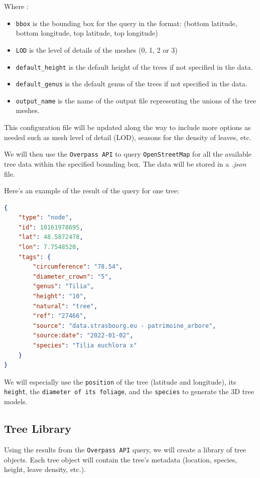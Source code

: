 \documentclass[12pt]{article}
\begin{document}
Where :
\begin{itemize}
    \item \texttt{bbox} is the bounding box for the query in the format:
    \subitem (bottom latitude, bottom longitude, top latitude, top longitude)

    \item \texttt{LOD} is the level of details of the meshes (0, 1, 2 or 3)
    \item \texttt{default\_height} is the default height of the trees if not specified in the data.
    \item \texttt{default\_genus} is the default genus of the trees if not specified in the data.
    \item \texttt{output\_name} is the name of the output file representing the unions of the tree meshes.
\end{itemize}

This configuration file will be updated along the way to include more options
as needed such as mesh level of detail (LOD), seasons for the density of leaves,
etc.

We will then use the \texttt{Overpass API} to query \texttt{OpenStreetMap}
for all the available tree data within the specified bounding box.
The data will be stored in a \textit{.json} file.

\newpage
Here's an example of the result of the query for one tree:

\begin{lstlisting}[language=json]
{
    "type": "node",
    "id": 10161978695,
    "lat": 48.5872478,
    "lon": 7.7548520,
    "tags": {
        "circumference": "78.54",
        "diameter_crown": "5",
        "genus": "Tilia",
        "height": "10",
        "natural": "tree",
        "ref": "27466",
        "source": "data.strasbourg.eu - patrimoine_arbore",
        "source:date": "2022-01-02",
        "species": "Tilia euchlora x"
    }
}
\end{lstlisting}

We will especially use the \texttt{position} of the tree (latitude and longitude),
its \texttt{height}, the \texttt{diameter of its foliage}, and the \texttt{species}
to generate the 3D tree models.

\subsection{Tree Library}
Using the results from the \texttt{Overpass API} query, we will create a library
of tree objects. Each tree object will contain the tree's metadata (location, species, height,
leave density, etc.).
\end{document}

